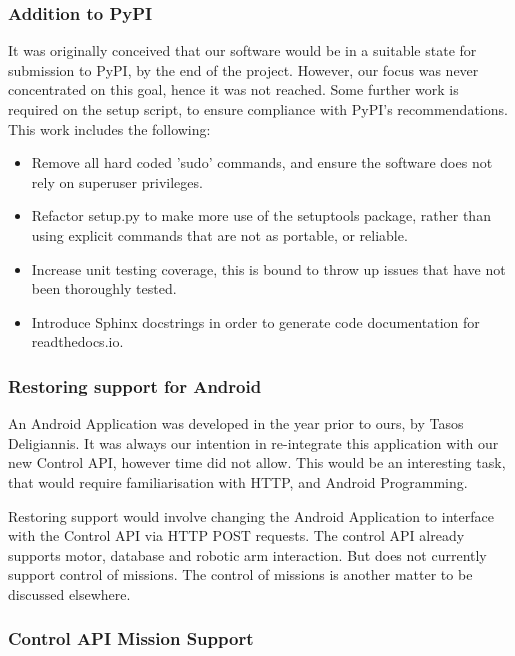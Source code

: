 \subsubsection{Addition to PyPI}
It was originally conceived that our software would be in a suitable state for submission to \gls{PyPI}, by the end of the project. However, our focus was never concentrated on this goal, hence it was not reached. Some further work is required on the setup script, to ensure compliance with \gls{PyPI}'s recommendations.
This work includes the following:
\begin{itemize}
\item Remove all hard coded 'sudo' commands, and ensure the software does not rely on superuser privileges.
\item Refactor setup.py to make more use of the setuptools package, rather than using explicit commands that are not as portable, or reliable.
\item Increase unit testing coverage, this is bound to throw up issues that have not been thoroughly tested.
\item Introduce Sphinx docstrings in order to generate code documentation for readthedocs.io.
\end{itemize}

\subsubsection{Restoring support for Android}
An Android Application was developed in the year prior to ours, by Tasos Deligiannis. It was always our intention in re-integrate this application with our new Control API, however time did not allow. This would be an interesting task, that would require familiarisation with HTTP, and Android Programming.

Restoring support would involve changing the Android Application to interface with the Control API via HTTP POST requests. The control API already supports motor, database and robotic arm interaction. But does not currently support control of missions. The control of missions is another matter to be discussed elsewhere.

\subsubsection{Control API Mission Support}
